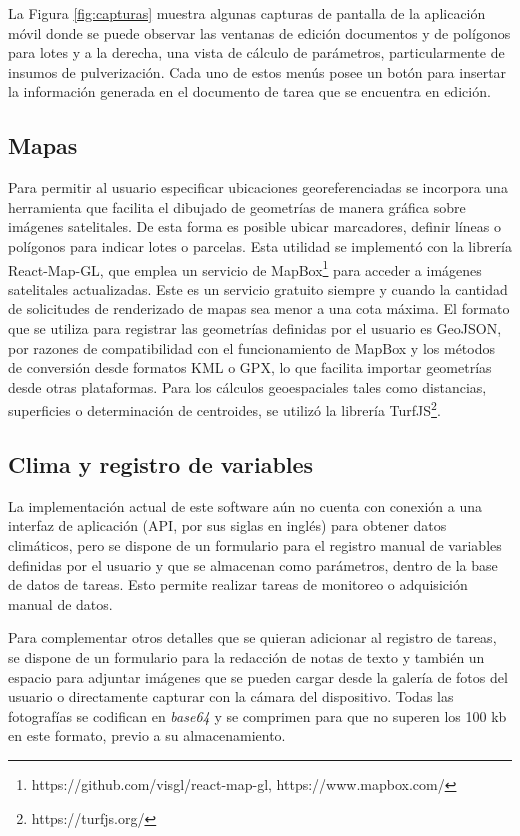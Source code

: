 La Figura \ref{fig:capturas} muestra algunas capturas de pantalla de la aplicación móvil donde se puede observar las ventanas de edición documentos y de polígonos para lotes y a la derecha, una vista de cálculo de parámetros, particularmente de insumos de pulverización. Cada uno de estos menús posee un botón para insertar la información generada en el documento de tarea que se encuentra en edición. 


\subsection{Mapas}
Para permitir al usuario especificar ubicaciones georeferenciadas se incorpora una herramienta que facilita el dibujado de geometrías de manera gráfica sobre imágenes satelitales. De esta forma es posible ubicar marcadores, definir líneas o polígonos para indicar lotes o parcelas. Esta utilidad se implementó con la librería React-Map-GL, que emplea un servicio de MapBox\footnote{https://github.com/visgl/react-map-gl, https://www.mapbox.com/} para acceder a imágenes satelitales actualizadas. Este es un servicio gratuito siempre y cuando la cantidad de solicitudes de renderizado de mapas sea menor a una cota máxima. El formato que se utiliza para registrar las geometrías definidas por el usuario es GeoJSON\cite{geojson}, por razones de compatibilidad con el funcionamiento de MapBox y los métodos de conversión desde formatos KML o GPX, lo que facilita importar geometrías desde otras plataformas. Para los cálculos geoespaciales tales como distancias, superficies o determinación de centroides, se utilizó la librería TurfJS\footnote{https://turfjs.org/}.

\subsection{Clima y registro de variables}
La implementación actual de este software aún no cuenta con conexión a una interfaz de aplicación (API, por sus siglas en inglés) para obtener datos climáticos, pero se dispone de un formulario para el registro manual de variables definidas por el usuario y que se almacenan como parámetros, dentro de la base de datos de tareas. Esto permite realizar tareas de monitoreo o adquisición manual de datos.

Para complementar otros detalles que se quieran adicionar al registro de tareas, se dispone de un formulario para la redacción de notas de texto y también un espacio para adjuntar imágenes que se pueden cargar desde la galería de fotos del usuario o directamente capturar con la cámara del dispositivo. Todas las fotografías se codifican en \textit{base64} y se comprimen para que no superen los 100 kb en este formato, previo a su almacenamiento. 

